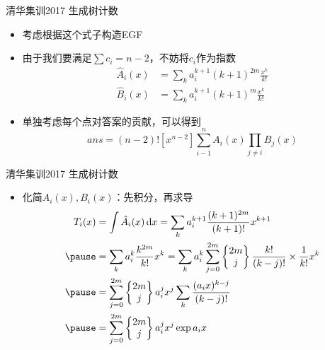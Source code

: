 \documentclass{beamer}
\begin{document}
\begin{frame}{清华集训2017 生成树计数}
    \begin{itemize}
        \item 考虑根据这个式子构造EGF \pause
        \item 由于我们要满足$\sum c_i = n - 2$，不妨将$c_i$作为指数 \pause
        $$\begin{aligned}
            \hat A_i(x) &= \sum_{k} a_i^{k + 1} (k + 1)^{2m} \frac{x^k}{k!}\\
            \hat B_i(x) &= \sum_{k} a_i^{k + 1} (k + 1)^m \frac{x^k}{k!}
        \end{aligned}$$ \pause
        \item 单独考虑每个点对答案的贡献，可以得到
        $$ans = (n - 2)![x^{n - 2}]\sum_{i - 1}^n A_i(x)\prod_{j\neq i}B_j(x)$$
    \end{itemize}
\end{frame}

\begin{frame}{清华集训2017 生成树计数}
    \begin{itemize}
        \item 化简$A_i(x), B_i(x)$：先积分，再求导 \pause
        $$\begin{aligned}
            T_i(x) &= \int \hat A_i(x)\,\mathrm{d}x = \sum_{k} a_i^{k + 1} \frac{(k + 1)^{2m}}{(k + 1)!} x^{k + 1}\\ \pause
            &= \sum_{k} a_i^k \frac{k^{2m}}{k!} x^k = \sum_{k} a_i^k \sum_{j = 0}^{2m} \begin{Bmatrix}2m\\ j\end{Bmatrix}\frac{k!}{(k - j)!}\times \frac{1}{k!} x^k\\ \pause
            &= \sum_{j = 0}^{2m} \begin{Bmatrix}2m\\ j\end{Bmatrix} a_i^j x^j \sum_{k} \frac{(a_ix)^{k - j}}{(k - j)!}\\ \pause
            &= \sum_{j = 0}^{2m} \begin{Bmatrix}2m\\ j\end{Bmatrix} a_i^j x^j \exp a_ix 
        \end{aligned}$$
    \end{itemize}
\end{frame}
\end{document}

